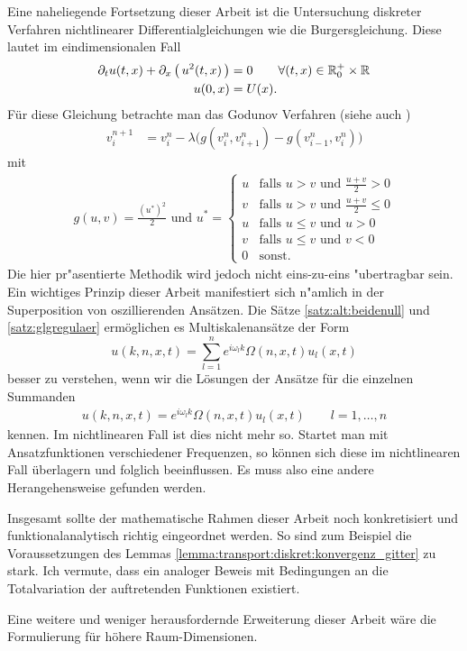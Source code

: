 
Eine naheliegende Fortsetzung dieser Arbeit ist die Untersuchung diskreter Verfahren nichtlinearer Differentialgleichungen wie die Burgersgleichung.
Diese lautet im eindimensionalen Fall
\begin{align}
\begin{split}
\partial_t u(t,x) + \partial_x \left( \, u^2(t,x) \,\right) &= 0 \qquad \forall (t,x) \in \mathbb R^+_0 \times \mathbb R\\
u(0,x) &= U(x).
\end{split}
\end{align}
Für diese Gleichung betrachte man das Godunov Verfahren (siehe auch \cite{leveque2002finite})
\begin{align}
v^{n+1}_i &= v^n_i - \lambda \bigl( g(v^n_i, v^n_{i+1}) - g(v^n_{i-1}, v^n_i) \bigr)
\end{align}
mit
\begin{align}
g(u,v) = \frac{\left(u^*\right)^2}2 \text{ und } u^* =
\begin{cases}
u & \text{falls $u > v$ und $\frac {u+v}2 > 0$}\\
v & \text{falls $u > v$ und $\frac {u+v}2 \leq 0$}\\
u & \text{falls $u \leq v$ und $u > 0$}\\
v & \text{falls $u \leq v$ und $v < 0$}\\
0 & \text{sonst.}
\end{cases}
\end{align}
Die hier pr"asentierte Methodik wird jedoch nicht eins-zu-eins "ubertragbar sein.
Ein wichtiges Prinzip dieser Arbeit manifestiert sich n"amlich in der Superposition von oszillierenden Ansätzen.
Die Sätze \ref{satz:alt:beidenull} und \ref{satz:glgregulaer} ermöglichen es Multiskalenansätze der Form
\[ u(k,n,x,t) = \sum_{l=1}^n e^{i \omega_l k} \Omega(n,x,t) u_l(x,t) \]
besser zu verstehen, wenn wir die Lösungen der Ansätze für die einzelnen Summanden
\begin{align}\label{burgers:1}
u(k,n,x,t) = e^{i \omega_l k} \Omega(n,x,t) u_l(x,t) \qquad l = 1, \ldots, n
\end{align}
kennen.
Im nichtlinearen Fall ist dies nicht mehr so.
Startet man mit Ansatzfunktionen verschiedener Frequenzen, so können sich diese im nichtlinearen Fall überlagern und folglich beeinflussen.
Es muss also eine andere Herangehensweise gefunden werden.

Insgesamt sollte der mathematische Rahmen dieser Arbeit noch konkretisiert und funktionalanalytisch richtig eingeordnet werden.
So sind zum Beispiel die Voraussetzungen des Lemmas \ref{lemma:transport:diskret:konvergenz_gitter} zu stark.
Ich vermute, dass ein analoger Beweis mit Bedingungen an die Totalvariation der auftretenden Funktionen existiert.

Eine weitere und weniger herausfordernde Erweiterung dieser Arbeit wäre die Formulierung für höhere Raum-Dimensionen.